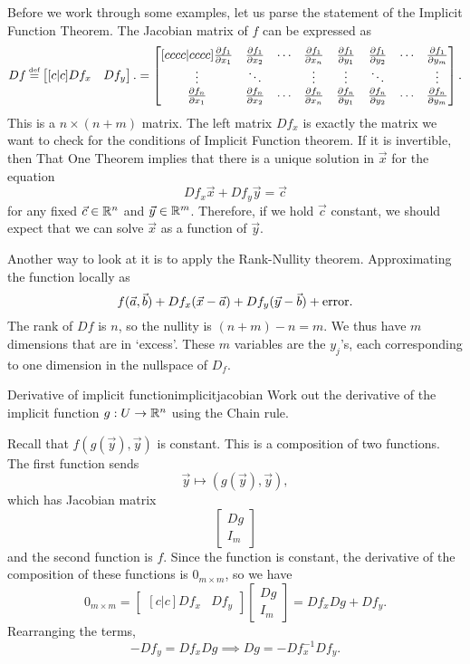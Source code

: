 Before we work through some examples, let us parse the statement of the Implicit Function Theorem. 
The Jacobian matrix of $f$ can be expressed as \[
    Df\defeq \begin{bmatrix}[c | c]
        Df_x&Df_y
    \end{bmatrix}.= \begin{bmatrix}[c c c c | c c c c]
        \pdv{f_1}{x_1} & \pdv{f_1}{x_2} & \cdots & \pdv{f_1}{x_n}& \pdv{f_1}{y_1} & \pdv{f_1}{y_2} & \cdots & \pdv{f_1}{y_m}\\
        \vdots &\ddots&& \vdots & \vdots &\ddots&& \vdots \\
        \pdv{f_n}{x_1}& \pdv{f_n}{x_2} &\cdots & \pdv{f_n}{x_n}&\pdv{f_n}{y_1}& \pdv{f_n}{y_2} &\cdots & \pdv{f_n}{y_m}
    \end{bmatrix}.
\]
This is a $n\times(n+m)$ matrix. The left matrix $Df_x$ is exactly the matrix we want to check for the conditions of Implicit Function theorem. If it is invertible, then That One Theorem implies that there is a unique solution in $\vec{x}$ for the equation \[
    Df_x \vec{x} + Df_y\vec{y}= \vec{c}
\]
for any fixed $\vec{c}\in \mathbb{R}^n$ and $\vec{y}\in \mathbb{R}^m$. Therefore, if we hold $\vec{c}$ constant, we should expect that we can solve $\vec{x}$ as a function of $\vec{y}$. 

Another way to look at it is to apply the Rank-Nullity theorem. Approximating the function locally as \[
    f(\vec{a},\vec{b})+Df_x(\vec{x}-\vec{a})+Df_y(\vec{y}-\vec{b})+ \rm{error}.
    \]
The rank of $Df$ is $n$, so the nullity is $(n+m)-n= m $. We thus have $m$ dimensions that are in `excess'. These $m$ variables are the $y_j$'s, each corresponding to one dimension in the nullspace of $D_f$. 

\begin{aexample}{Derivative of implicit function}{implicitjacobian}
    Work out the derivative of the implicit function $g:U\to \mathbb{R}^n$ using the Chain rule.
\end{aexample}

Recall that $f(g(\vec{y}),\vec{y})$ is constant. This is a composition of two functions. The first function sends \[
\vec{y}\mapsto (g(\vec{y}),\vec{y}),
\]
which has Jacobian matrix \[
    \begin{bmatrix}
        Dg \\\hline I_m
    \end{bmatrix}
\]
and the second function is $f$. Since the function is constant, the derivative of the composition of these functions is $0_{m\times m}$, so we have \[
    0_{m\times m}=
    \begin{bmatrix}[c | c]
        Df_x&Df_y
    \end{bmatrix} \begin{bmatrix}
        Dg \\\hline I_m
    \end{bmatrix} = Df_xDg + Df_y.
\]
Rearranging the terms,\[
    -Df_y = Df_xDg \implies Dg = -Df_x^{-1}Df_y.
\]


